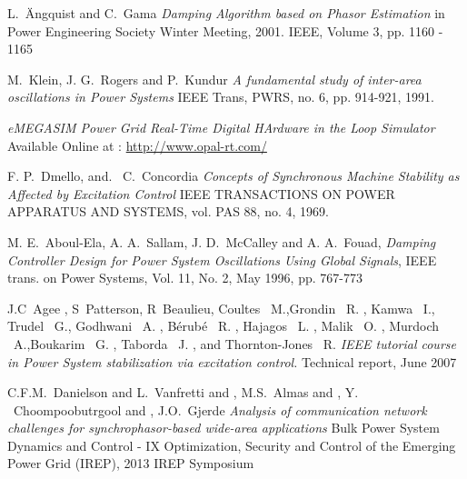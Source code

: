 \documentclass[journal]{IEEEtran}
\begin{document}
%
%
%
\begin{thebibliography}{1}

L.~\"{A}ngquist and C.~Gama  \emph{Damping Algorithm based on Phasor Estimation} in Power Engineering Society Winter Meeting, 2001. IEEE, Volume 3, pp. 1160 - 1165  

M.~Klein, J. G.~Rogers and P.~Kundur \emph{A fundamental study of inter-area oscillations in Power Systems} IEEE Trans, PWRS, no. 6, pp. 914-921, 1991. 

 \emph{eMEGASIM Power Grid Real-Time Digital HArdware in the Loop Simulator} Available Online at : \url{http://www.opal-rt.com/}

 F. P.~Dmello, and. \ C.~Concordia
  \emph{Concepts of Synchronous Machine Stability as Affected by Excitation Control} IEEE TRANSACTIONS ON POWER APPARATUS AND SYSTEMS, vol. PAS 88, no. 4, 1969. 
  
  M. E.~Aboul-Ela, A. A.~Sallam, J. D.~McCalley and A. A.~Fouad, \emph{Damping Controller Design for Power System Oscillations Using Global Signals}, IEEE trans. on Power Systems, Vol. 11, No. 2, May 1996, pp. 767-773

 J.C~Agee , S~Patterson, R~Beaulieu, Coultes \ M.,Grondin \ R. , Kamwa \ I.,
Trudel \ G., Godhwani \ A. , Bérubé \ R. , Hajagos \ L. , Malik \ O. , Murdoch \ A.,Boukarim \ G. , Taborda \ J. , and Thornton-Jones \ R. \emph{IEEE tutorial course in Power System stabilization via excitation control.} Technical report, June 2007

 C.F.M.~Danielson and L.~Vanfretti and , M.S.~Almas and , Y. ~Choompoobutrgool and , J.O.~Gjerde \emph{Analysis of communication network challenges for synchrophasor-based wide-area applications} Bulk Power System Dynamics and Control - IX Optimization, Security and Control of the Emerging Power Grid (IREP), 2013 IREP Symposium


\end{thebibliography}
\end{document}
